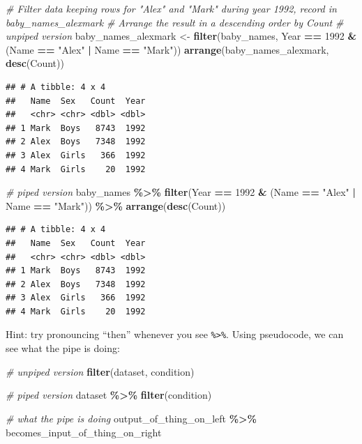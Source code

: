 \documentclass[
]{book}
\newenvironment{Shaded}{\begin{snugshade}}{\end{snugshade}}
\newcommand{\CommentTok}[1]{\textcolor[rgb]{0.56,0.35,0.01}{\textit{#1}}}
\newcommand{\DecValTok}[1]{\textcolor[rgb]{0.00,0.00,0.81}{#1}}
\newcommand{\KeywordTok}[1]{\textcolor[rgb]{0.13,0.29,0.53}{\textbf{#1}}}
\newcommand{\NormalTok}[1]{#1}
\newcommand{\OperatorTok}[1]{\textcolor[rgb]{0.81,0.36,0.00}{\textbf{#1}}}
\newcommand{\StringTok}[1]{\textcolor[rgb]{0.31,0.60,0.02}{#1}}
\begin{document}
\begin{Shaded}
\begin{Highlighting}[]
\CommentTok{\# Filter data keeping rows for "Alex" and "Mark" during year 1992, record in baby\_names\_alexmark}
\CommentTok{\# Arrange the result in a descending order by Count}
\CommentTok{\# unpiped version}
\NormalTok{baby\_names\_alexmark \textless{}{-}}\StringTok{ }\KeywordTok{filter}\NormalTok{(baby\_names, Year }\OperatorTok{==}\StringTok{ }\DecValTok{1992} \OperatorTok{\&}\StringTok{ }\NormalTok{(Name }\OperatorTok{==}\StringTok{ "Alex"} \OperatorTok{|}\StringTok{ }\NormalTok{Name }\OperatorTok{==}\StringTok{ "Mark"}\NormalTok{))}
\KeywordTok{arrange}\NormalTok{(baby\_names\_alexmark, }\KeywordTok{desc}\NormalTok{(Count))}
\end{Highlighting}
\end{Shaded}

\begin{verbatim}
## # A tibble: 4 x 4
##   Name  Sex   Count  Year
##   <chr> <chr> <dbl> <dbl>
## 1 Mark  Boys   8743  1992
## 2 Alex  Boys   7348  1992
## 3 Alex  Girls   366  1992
## 4 Mark  Girls    20  1992
\end{verbatim}

\begin{Shaded}
\begin{Highlighting}[]
\CommentTok{\# piped version}
\NormalTok{baby\_names }\OperatorTok{\%\textgreater{}\%}\StringTok{ }
\StringTok{  }\KeywordTok{filter}\NormalTok{(Year }\OperatorTok{==}\StringTok{ }\DecValTok{1992} \OperatorTok{\&}\StringTok{ }\NormalTok{(Name }\OperatorTok{==}\StringTok{ "Alex"} \OperatorTok{|}\StringTok{ }\NormalTok{Name }\OperatorTok{==}\StringTok{ "Mark"}\NormalTok{)) }\OperatorTok{\%\textgreater{}\%}
\StringTok{  }\KeywordTok{arrange}\NormalTok{(}\KeywordTok{desc}\NormalTok{(Count))}
\end{Highlighting}
\end{Shaded}

\begin{verbatim}
## # A tibble: 4 x 4
##   Name  Sex   Count  Year
##   <chr> <chr> <dbl> <dbl>
## 1 Mark  Boys   8743  1992
## 2 Alex  Boys   7348  1992
## 3 Alex  Girls   366  1992
## 4 Mark  Girls    20  1992
\end{verbatim}

Hint: try pronouncing ``then'' whenever you see \texttt{\%\textgreater{}\%}. Using pseudocode, we can see what the pipe is doing:

\begin{Shaded}
\begin{Highlighting}[]
\CommentTok{\# unpiped version}
\KeywordTok{filter}\NormalTok{(dataset, condition)}

\CommentTok{\# piped version}
\NormalTok{dataset }\OperatorTok{\%\textgreater{}\%}\StringTok{ }\KeywordTok{filter}\NormalTok{(condition)}

\CommentTok{\# what the pipe is doing}
\NormalTok{output\_of\_thing\_on\_left }\OperatorTok{\%\textgreater{}\%}\StringTok{ }\NormalTok{becomes\_input\_of\_thing\_on\_right}
\end{Highlighting}
\end{Shaded}
\end{document}
